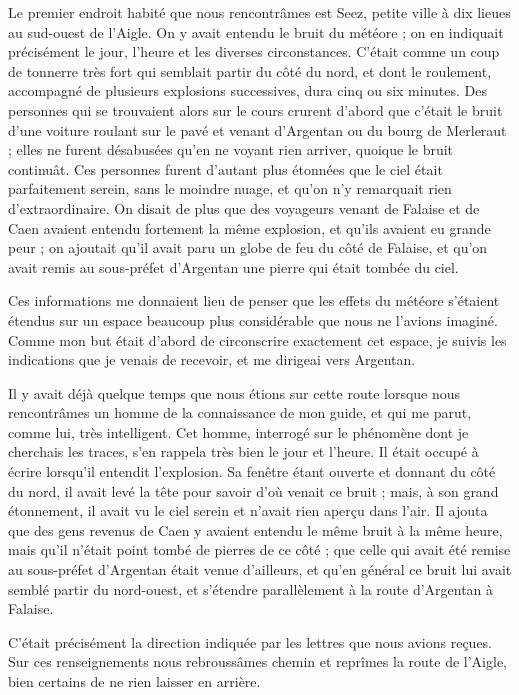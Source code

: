 \documentclass[a4paper, 11pt, oneside, polutonikogreek, french]{article}
\begin{document}
Le premier endroit habité que nous rencontrâmes est Seez, petite ville à dix lieues au sud-ouest de l'Aigle. On y avait entendu le bruit du météore ; on en indiquait précisément le jour, l'heure et les diverses circonstances. C'était comme un coup de tonnerre très fort qui semblait partir du côté du nord, et dont le roulement, accompagné de plusieurs explosions successives, dura cinq ou six minutes. Des personnes qui se trouvaient alors sur le cours crurent d'abord que c'était le bruit d'une voiture roulant sur le pavé et venant d'Argentan ou du bourg de Merleraut ; elles ne furent désabusées qu'en ne voyant rien arriver, quoique le bruit continuât. Ces personnes furent d'autant plus étonnées que le ciel était parfaitement serein, sans le moindre nuage, et qu'on n'y remarquait rien d'extraordinaire. On disait de plus que des voyageurs venant de Falaise et de Caen avaient entendu fortement la même explosion, et qu'ils avaient eu grande peur ; on ajoutait qu'il avait paru un globe de feu du côté de Falaise, et qu'on avait remis au sous-préfet d'Argentan une pierre qui était tombée du ciel.

Ces informations me donnaient lieu de penser que les effets du météore s'étaient étendus sur un espace beaucoup plus considérable que nous ne l'avions imaginé. Comme mon but était d'abord de circonscrire exactement cet espace, je suivis les indications que je venais de recevoir, et me dirigeai vers Argentan.

Il y avait déjà quelque temps que nous étions sur cette route lorsque nous rencontrâmes un homme de la connaissance de mon guide, et qui me parut, comme lui, très intelligent. Cet homme, interrogé sur le phénomène dont je cherchais les traces, s'en rappela très bien le jour et l'heure. Il était occupé à écrire lorsqu'il entendit l'explosion. Sa fenêtre étant ouverte et donnant du côté du nord, il avait levé la tête pour savoir d'où venait ce bruit ; mais, à son grand étonnement, il avait vu le ciel serein et n'avait rien aperçu dans l'air. Il ajouta que des gens revenus de Caen y avaient entendu le même bruit à la même heure, mais qu'il n'était point tombé de pierres de ce côté ; que celle qui avait été remise au sous-préfet d'Argentan était venue d'ailleurs, et qu'en général ce bruit lui avait semblé partir du nord-ouest, et s'étendre parallèlement à la route d'Argentan à Falaise.

C'était précisément la direction indiquée par les lettres que nous avions reçues. Sur ces renseignements nous rebroussâmes chemin et reprîmes la route de l'Aigle, bien certains de ne rien laisser en arrière.
\end{document}
